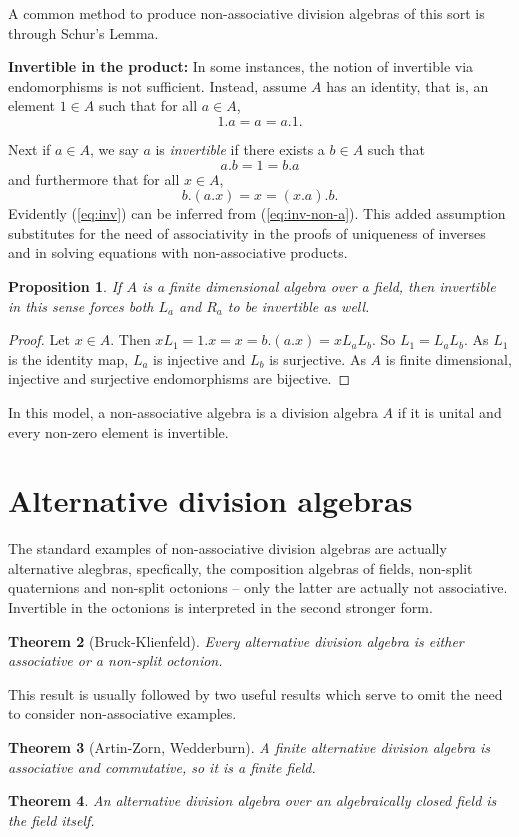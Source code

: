 \documentclass[12pt]{article}
\newtheorem{thm}{Theorem}
\newtheorem{prop}[thm]{Proposition}
\begin{document}
A common method to produce non-associative division algebras of this sort is
through Schur's Lemma.  

\textbf{Invertible in the product:}
In some instances, the notion of invertible via endomorphisms is not 
sufficient.  Instead, assume $A$ has an identity, that is, an element $1\in A$ such
that for all $a\in A$,
\[1.a=a=a.1.\]

Next if $a\in A$, we say $a$ is \emph{invertible} if there exists a $b\in A$
such that 
\begin{equation}\label{eq:inv}
a.b=1=b.a
\end{equation}
and furthermore that for all $x\in A$,
\begin{equation}\label{eq:inv-non-a}
b.(a.x)=x=(x.a).b.
\end{equation}
Evidently (\ref{eq:inv}) can be inferred from (\ref{eq:inv-non-a}).
This added assumption substitutes for the need of associativity in the
proofs of uniqueness of inverses and in solving equations with non-associative
products.  

\begin{prop}
If $A$ is a finite dimensional algebra over a field, then
invertible in this sense forces both $L_a$ and $R_a$ to be invertible as well.
\end{prop}
\begin{proof}
Let $x\in A$.  Then $xL_1=1.x=x=b.(a.x)=x L_a L_b$.  So $L_1=L_a L_b$.  As
$L_1$ is the identity map, $L_a$ is injective and $L_b$ is surjective.
As $A$ is finite dimensional, injective and surjective endomorphisms are
bijective.
\end{proof}


In this model, a non-associative algebra is a division algebra $A$ if it is
unital and every non-zero element is invertible.

\section{Alternative division algebras}

The standard examples of non-associative division algebras are actually 
alternative alegbras, specfically, the composition algebras of fields,
non-split quaternions and non-split octonions -- only the latter are
actually not associative.  Invertible in the octonions is interpreted
in the second stronger form.

\begin{thm}[Bruck-Klienfeld]
Every alternative division algebra is either associative or a non-split
octonion.
\end{thm}

This result is usually followed by two useful results which serve to omit
the need to consider non-associative examples.

\begin{thm}[Artin-Zorn, Wedderburn]
A finite alternative division algebra is associative and commutative, so 
it is a finite field.
\end{thm}

\begin{thm}
An alternative division algebra over an algebraically closed field is
the field itself.
\end{thm}

\end{document}
